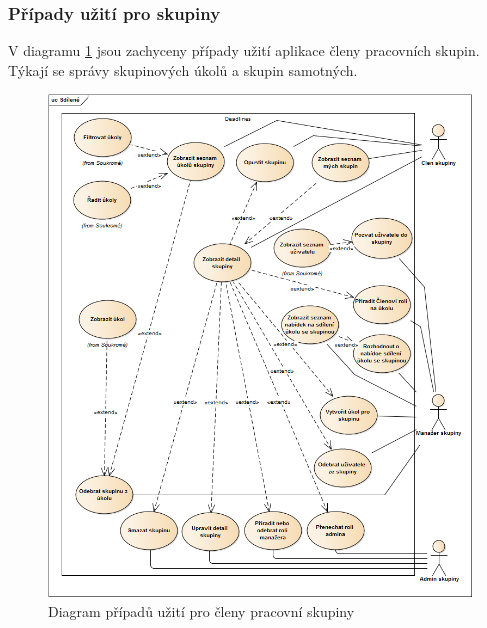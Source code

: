 \documentclass[thesis=B,czech]{FITthesis}[2012/06/26]
\begin{document}
			
			
			
			\subsubsection{Případy užití pro skupiny}
			V diagramu \ref{diagram:uc-shared} jsou zachyceny případy užití aplikace členy pracovních skupin. Týkají se správy skupinových úkolů a skupin samotných. 
			
			\begin{figure}\centering
				\includegraphics[width=1.0\textwidth]{ea-diagrams/uc-shared.png}
				\caption[Případy užití skupin]{Diagram případů užití pro členy pracovní skupiny}
				\label{diagram:uc-shared}
			\end{figure}
			
\end{document}
